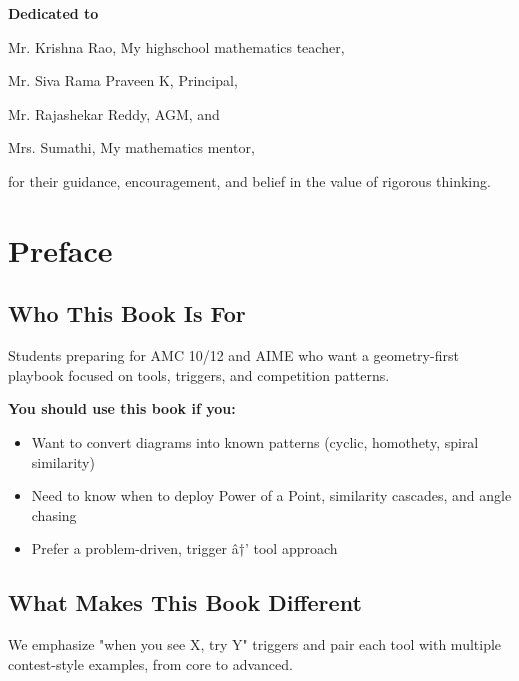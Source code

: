 ﻿\documentclass[12pt]{extarticle}
\begin{document}
\thispagestyle{empty}
\vspace*{\fill}
\begin{center}
\Large

\textbf{Dedicated to}

\vspace{1cm}

Mr. Krishna Rao, My highschool mathematics teacher,

Mr. Siva Rama Praveen K, Principal,

Mr. Rajashekar Reddy, AGM, and

Mrs. Sumathi, My mathematics mentor,

\vspace{1cm}

for their guidance, encouragement, and belief in the value of rigorous thinking.
\end{center}
\vspace*{\fill}

\newpage

	\tableofcontents
\newpage

\section*{Preface}

\subsection*{Who This Book Is For}
Students preparing for AMC 10/12 and AIME who want a geometry-first playbook focused on tools, triggers, and competition patterns.

	\textbf{You should use this book if you:}
\begin{itemize}
  \item Want to convert diagrams into known patterns (cyclic, homothety, spiral similarity)
  \item Need to know when to deploy Power of a Point, similarity cascades, and angle chasing
  \item Prefer a problem-driven, trigger â†’ tool approach
\end{itemize}

\subsection*{What Makes This Book Different}
We emphasize "when you see X, try Y" triggers and pair each tool with multiple contest-style examples, from core to advanced.
\end{document}
